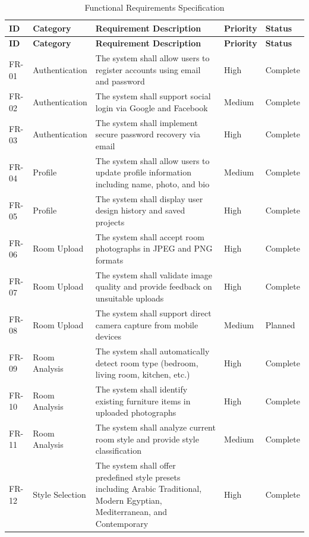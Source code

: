 \begin{longtable}{|p{1.2cm}|p{2.8cm}|p{5.4cm}|p{1.5cm}|p{1.8cm}|}
    \caption{Functional Requirements Specification} \label{tab:functional_requirements} \\
    \hline
    \textbf{ID} & \textbf{Category} & \textbf{Requirement Description} & \textbf{Priority} & \textbf{Status} \\
    \hline
    \endfirsthead
    \hline
    \textbf{ID} & \textbf{Category} & \textbf{Requirement Description} & \textbf{Priority} & \textbf{Status} \\
    \hline
    \endhead
    \hline
    \endfoot
    
    FR-01 & Authentication & The system shall allow users to register accounts using email and password & High & Complete \\
    \hline
    FR-02 & Authentication & The system shall support social login via Google and Facebook & Medium & Complete \\
    \hline
    FR-03 & Authentication & The system shall implement secure password recovery via email & High & Complete \\
    \hline
    FR-04 & Profile & The system shall allow users to update profile information including name, photo, and bio & Medium & Complete \\
    \hline
    FR-05 & Profile & The system shall display user design history and saved projects & High & Complete \\
    \hline
    FR-06 & Room Upload & The system shall accept room photographs in JPEG and PNG formats & High & Complete \\
    \hline
    FR-07 & Room Upload & The system shall validate image quality and provide feedback on unsuitable uploads & High & Complete \\
    \hline
    FR-08 & Room Upload & The system shall support direct camera capture from mobile devices & Medium & Planned \\
    \hline
    FR-09 & Room Analysis & The system shall automatically detect room type (bedroom, living room, kitchen, etc.) & High & Complete \\
    \hline
    FR-10 & Room Analysis & The system shall identify existing furniture items in uploaded photographs & High & Complete \\
    \hline
    FR-11 & Room Analysis & The system shall analyze current room style and provide style classification & Medium & Complete \\
    \hline
    FR-12 & Style Selection & The system shall offer predefined style presets including Arabic Traditional, Modern Egyptian, Mediterranean, and Contemporary & High & Complete \\

\end{longtable}
